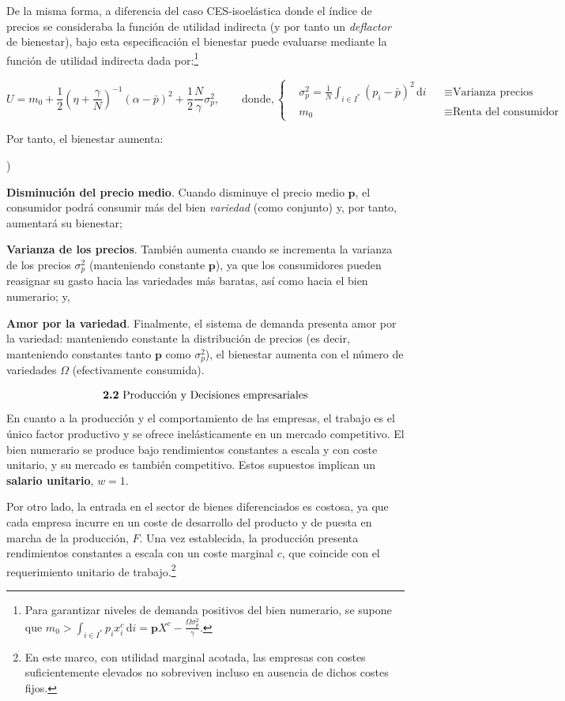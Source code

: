 \documentclass[10pt,a4paper]{article}
\newcounter{alphaitem}
\newenvironment{la}
      {\begin{list}{\alph{alphaitem})}{%
          \usecounter{alphaitem}%
          \setlength{\leftmargin}{1cm}%
          \setlength{\parskip}{3pt}%
          \setlength{\itemsep}{0pt}%
          \setlength{\parsep}{0pt}%
      }}
      {\end{list}}
\begin{document}
De la misma forma, a diferencia del caso CES-isoelástica donde el índice de precios se consideraba la función de utilidad indirecta (y por tanto un \textit{deflactor} de bienestar), bajo esta especificación el bienestar puede evaluarse mediante la función de utilidad indirecta dada por:\footnote{%
    Para garantizar niveles de demanda positivos del bien numerario, se supone que $m_0 > \int_{i \in I^*} p_i x_i^c \, \mathrm di = \mathbf{p} X^c - \frac{\Omega \sigma_p^2}{\gamma}$.
}

$$U = m_0 + \frac{1}{2}\left(\eta +\frac{\gamma}{N}\right)^{-1}(\alpha - \bar{p})^2 + \frac{1}{2} \frac{N}{\gamma} \sigma_p^2,\qquad\text{donde},
\left\{\begin{aligned}
    &\sigma_p^2 = \frac{1}{N} \int_{i \in I^*} (p_i - \bar{p})^2 \, \mathrm di&&\equiv \text{Varianza precios}\\[1em]
    &m_0&&\equiv\text{Renta del consumidor}
\end{aligned}\right.$$

Por tanto, el bienestar aumenta:
\begin{la}
    \item \textbf{Disminución del precio medio}. Cuando disminuye el precio medio $\mathbf{p}$, el consumidor podrá consumir más del bien \textit{variedad} (como conjunto) y, por tanto, aumentará su bienestar;
    \item \textbf{Varianza de los precios}. También aumenta cuando se incrementa la varianza de los precios $\sigma_p^2$ (manteniendo constante $\mathbf{p}$), ya que los consumidores pueden reasignar su gasto hacia las variedades más baratas, así como hacia el bien numerario; y,
    \item \textbf{Amor por la variedad}. Finalmente, el sistema de demanda presenta amor por la variedad: manteniendo constante la distribución de precios (es decir, manteniendo constantes tanto $\mathbf{p}$ como $\sigma_p^2$), el bienestar aumenta con el número de variedades $\Omega$ (efectivamente consumida).
\end{la}

$$\text{\textbf{2.2} Producción y Decisiones empresariales}$$
En cuanto a la producción y el comportamiento de las empresas, el trabajo es el único factor productivo y se ofrece inelásticamente en un mercado competitivo. El bien numerario se produce bajo rendimientos constantes a escala y con coste unitario, y su mercado es también competitivo. Estos supuestos implican un \textbf{salario unitario}, $w=1$. 

Por otro lado, la entrada en el sector de bienes diferenciados es costosa, ya que cada empresa incurre en un coste de desarrollo del producto y de puesta en marcha de la producción, $F$. Una vez establecida, la producción presenta rendimientos constantes a escala con un coste marginal $c$, que coincide con el requerimiento unitario de trabajo.\footnote{%
    En este marco, con utilidad marginal acotada, las empresas con costes suficientemente elevados no sobreviven incluso en ausencia de dichos costes fijos.
} 
\end{document}
